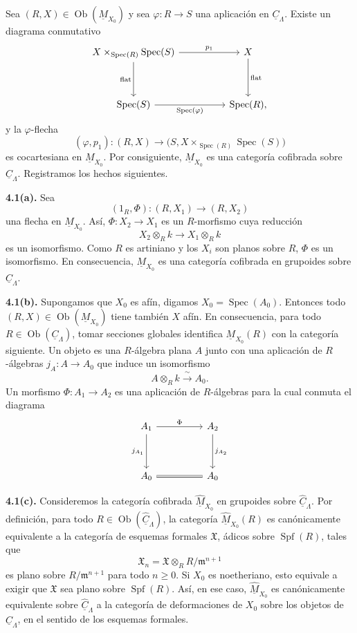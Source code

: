 Sea $(R,X)\in\operatorname{Ob}(\underline M_{X_0})$ y sea
$\varphi:R\longrightarrow S$ una aplicación en
$\underline C_\Lambda$. Existe un diagrama conmutativo
\[
\begin{tikzcd}[column sep=huge,row sep=huge]
X\times_{\operatorname{Spec}(R)}\operatorname{Spec}(S)
 \arrow[r,"p_1"] \arrow[d,"\mathrm{flat}"']
& X \arrow[d,"\mathrm{flat}"] \\
\operatorname{Spec}(S)
 \arrow[r,"\operatorname{Spec}(\varphi)"']
& \operatorname{Spec}(R),
\end{tikzcd}
\]
y la $\varphi$-flecha
\[
 (\varphi,p_1):(R,X)\longrightarrow
 \bigl(S,X\times_{\operatorname{Spec}(R)}\operatorname{Spec}(S)\bigr)
\]
es cocartesiana en $\underline M_{X_0}$. Por consiguiente,
$\underline M_{X_0}$ es una categoría cofibrada sobre
$\underline C_\Lambda$. Registramos los hechos siguientes.


\medskip
\noindent\textbf{4.1(a).}
Sea
\[
 (1_R,\Phi):(R,X_1)\longrightarrow(R,X_2)
\]
una flecha en $\underline M_{X_0}$. Así,
$\Phi:X_2\longrightarrow X_1$ es un $R$-morfismo cuya reducción
\[
 X_2\otimes_Rk\longrightarrow X_1\otimes_Rk
\]
es un isomorfismo. Como $R$ es artiniano y los $X_i$ son planos sobre
$R$, $\Phi$ es un isomorfismo. En consecuencia,
$\underline M_{X_0}$ es una categoría cofibrada en grupoides sobre
$\underline C_\Lambda$.

\medskip
\noindent\textbf{4.1(b).}
Supongamos que $X_0$ es afín, digamos
$X_0=\operatorname{Spec}(A_0)$. Entonces todo
$(R,X)\in\operatorname{Ob}(\underline M_{X_0})$ tiene también $X$
afín. En consecuencia, para todo
$R\in\operatorname{Ob}(\underline C_\Lambda)$, tomar secciones
globales identifica $\underline M_{X_0}(R)$ con la categoría
siguiente. Un objeto es una $R$-álgebra plana $A$ junto con una
aplicación de $R$-álgebras $j_A:A\longrightarrow A_0$ que induce un
isomorfismo
\[
 A\otimes_Rk\xrightarrow{\ \sim\ }A_0.
\]
Un morfismo $\Phi:A_1\longrightarrow A_2$ es una aplicación de
$R$-álgebras para la cual conmuta el diagrama
\[
\begin{tikzcd}[column sep=huge,row sep=huge]
A_1 \arrow[r,"\Phi"] \arrow[d,"j_{A_1}"']
& A_2 \arrow[d,"j_{A_2}"] \\
A_0 \arrow[r,equal] & A_0
\end{tikzcd}
\]

\medskip
\noindent\textbf{4.1(c).}
Consideremos la categoría cofibrada
$\widehat{\underline M}_{X_0}$ en grupoides sobre
$\widehat{\underline C}_\Lambda$. Por definición, para todo
$R\in\operatorname{Ob}(\widehat{\underline C}_\Lambda)$, la categoría
$\widehat{\underline M}_{X_0}(R)$ es canónicamente equivalente a la
categoría de esquemas formales $\mathfrak X$, ádicos sobre
$\operatorname{Spf}(R)$, tales que
\[
 \mathfrak X_n
 =\mathfrak X\otimes_R R/\mathfrak m^{n+1}
\]
es plano sobre $R/\mathfrak m^{n+1}$ para todo $n\geq0$. Si $X_0$ es
noetheriano, esto equivale a exigir que $\mathfrak X$ sea plano sobre
$\operatorname{Spf}(R)$. Así, en ese caso,
$\widehat{\underline M}_{X_0}$ es canónicamente equivalente sobre
$\widehat{\underline C}_\Lambda$ a la categoría de deformaciones de
$X_0$ sobre los objetos de $\widehat{\underline C}_\Lambda$, en el
sentido de los esquemas formales.

